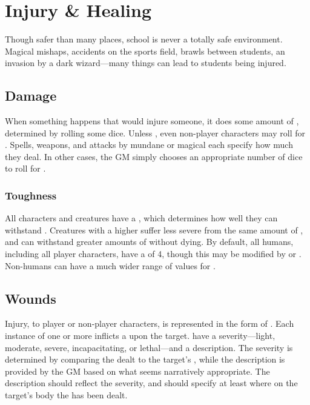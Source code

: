 \section{Injury \& Healing}

Though safer than many places, school is never a totally safe environment.
Magical mishaps, accidents on the sports field, brawls between students, an invasion by a dark wizard---many things can lead to students being injured.

\subsection{Damage}

When something happens that would injure someone, it does some amount of {\damage}, determined by rolling some dice.
Unless {\tests}, even non-player characters may roll for {\damage}.
Spells, weapons, and attacks by mundane or magical each specify how much {\damage} they deal.
In other cases, the GM simply chooses an appropriate number of dice to roll for {\damage}.

\subsubsection{Toughness}

All characters and creatures have a {\toughness}, which determines how well they can withstand {\damage}.
Creatures with a higher {\toughness} suffer less severe {\wounds} from the same amount of {\damage}, and can withstand greater amounts of {\damage} without dying.
By default, all humans, including all player characters, have a {\toughness} of 4, though this may be modified by {\virtues} or {\flaws}.
Non-humans can have a much wider range of values for {\toughness}.

\subsection{Wounds}

Injury, to player or non-player characters, is represented in the form of {\wounds}.
Each instance of one or more {\damage} inflicts a {\wound} upon the target.
\capital{\wounds} have a severity---light, moderate, severe, incapacitating, or lethal---and a description.
The severity is determined by comparing the {\damage} dealt to the target's {\toughness}, while the description is provided by the GM based on what seems narratively appropriate.
The description should reflect the severity, and should specify at least where on the target's body the {\wound} has been dealt.

